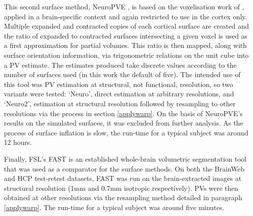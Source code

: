 This second surface method, NeuroPVE \cite{NeuropolyPVE}, is based on the voxelisation work of \cite{Nooruddin2003}, applied in a brain-specific context and again restricted to use in the cortex only. Multiple expanded and contracted copies of each cortical surface are created and the ratio of expanded to contracted surfaces intersecting a given voxel is used as a first approximation for partial volumes. This ratio is then mapped, along with surface orientation information, via trigonometric relations on the unit cube into a PV estimate. The estimates produced take discrete values according to the number of surfaces used (in this work the default of five). The intended use of this tool was PV estimation at structural, not functional, resolution, so two variants were tested: ‘Neuro’, direct estimation at arbitrary resolutions, and ‘Neuro2’, estimation at structural resolution followed by resampling to other resolutions via the process in section \ref{applywarp}. On the basis of NeuroPVE’s results on the simulated surfaces, it was excluded from further analysis. As the process of surface inflation is slow, the run-time for a typical subject was around 12 hours. 

Finally, FSL’s FAST \cite{Zhang2001} is an established whole-brain volumetric segmentation tool that was used as a comparator for the surface methods. On both the BrainWeb and HCP test-retest datasets, FAST was run on the brain-extracted images at structural resolution (1mm and 0.7mm isotropic respectively). PVs were then obtained at other resolutions via the resampling method detailed in paragraph \ref{applywarp}. The run-time for a typical subject was around five minutes. 

